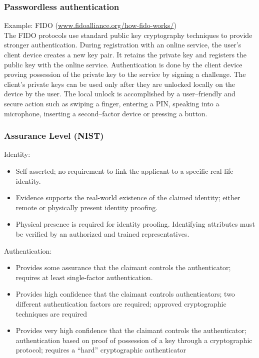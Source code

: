 \documentclass[a4paper, 10pt, titlepage]{article}
\begin{document}
\subsubsection{Passwordless authentication}
Example: FIDO (\url{www.fidoalliance.org/how-fido-works/}) \\
The FIDO protocols use standard public key cryptography techniques to provide stronger authentication. During registration with an online service, the user’s client device creates a new key pair. It retains the private key and registers the public key with the online service. Authentication is done by the client device proving possession of the private key to the service by signing a challenge. The client’s private keys can be used only after they are unlocked locally on the device by the user. The local unlock is accomplished by a user–friendly and secure action such as swiping a finger, entering a PIN, speaking into a microphone, inserting a second–factor device or pressing a button.

\subsubsection{Assurance Level (NIST)}
Identity:
\begin{itemize}
\item Self-asserted; no requirement to link the applicant to a specific real-life identity.
\item Evidence supports the real-world existence of the claimed identity; either remote or physically present identity proofing.
\item Physical presence is required for identity proofing. Identifying attributes must be verified by an authorized and trained representatives.
\end{itemize}
Authentication:
\begin{itemize}
\item Provides some assurance that the claimant controls the authenticator; requires at least single-factor authentication.
\item Provides high confidence that the claimant controls authenticators; two different authentication factors are required;
approved cryptographic techniques are required
\item Provides very high confidence that the claimant controls the authenticator; authentication based on proof of possession of a key through a cryptographic protocol; requires a “hard” cryptographic authenticator
\end{itemize}
\end{document}
